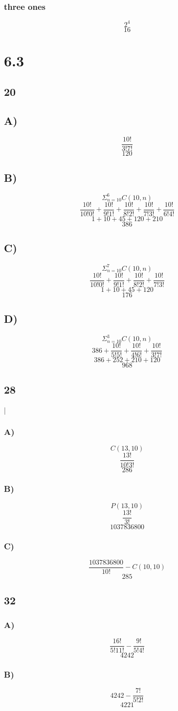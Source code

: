 \documentclass[journal]{IEEEtran}
\begin{document}
\subsubsection*{three ones}
$$2^4$$
$$\boxed{16}$$

\section*{6.3}

\subsection*{20}
\subsection*{A)}
$$\frac{10!}{3!7!}$$
$$\boxed{120}$$

\subsection*{B)}
$$\Sigma_{n = 10}^6 C(10,n)$$
$$\frac{10!}{10!0!} + \frac{10!}{9!1!} + \frac{10!}{8!2!} + \frac{10!}{7!3!} + \frac{10!}{6!4!}$$
$$1 + 10 + 45 + 120 + 210$$
$$\boxed{386}$$

\subsection*{C)}
$$\Sigma_{n = 10}^7 C(10,n)$$
$$\frac{10!}{10!0!} + \frac{10!}{9!1!} + \frac{10!}{8!2!} + \frac{10!}{7!3!}$$
$$1 + 10 + 45 + 120$$
$$\boxed{176}$$

\subsection*{D)}
$$\Sigma_{n = 10}^3 C(10,n)$$
$$386 + \frac{10!}{5!5!} + \frac{10!}{4!6!} + \frac{10!}{3!7!} $$
$$386 + 252 + 210 + 120$$
$$\boxed{968}$$

\subsection*{28}|
\subsubsection*{A)}
$$C(13,10)$$
$$\frac{13!}{10!3!}$$
$$\boxed{286}$$

\subsubsection*{B)}
$$P(13,10)$$
$$\frac{13!}{3!}$$
$$\boxed{1037836800}$$

\subsubsection*{C)}
$$\frac{1037836800}{10!} - C(10,10)$$
$$\boxed{285}$$

\subsection*{32}
\subsubsection*{A)}
$$\frac{16!}{5!11!} - \frac{9!}{5!4!}$$
$$\boxed{4242}$$

\subsubsection*{B)}
$$4242 - \frac{7!}{5!2!}$$
$$\boxed{4221}$$
\end{document}
